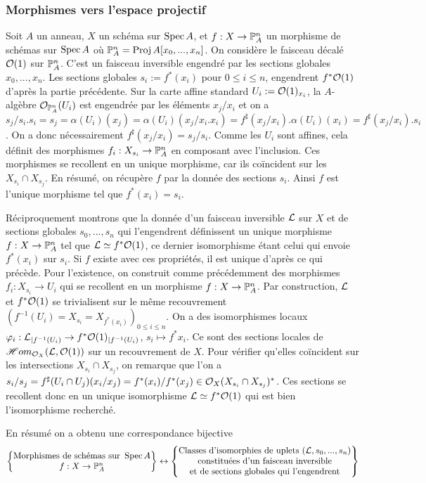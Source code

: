 \subsubsection{Morphismes vers l'espace projectif}
\label{morphismeproj}

Soit $A$ un anneau, $X$ un schéma sur $\operatorname{Spec} A$, et $f:X\rightarrow\mathbb{P}_A^n$ un morphisme de schémas sur $\operatorname{Spec} A$ où $\mathbb{P}^n_A=\operatorname{Proj} A[x_0,...,x_n]$. On considère le faisceau décalé $\mathcal{O}(1)$ sur $\mathbb{P}^n_A$. C'est un faisceau inversible engendré par les sections globales $x_0,...,x_n$. Les sections globales $s_i:=f^*(x_i)$ pour $0\leq i\leq n$, engendrent $f^*\mathcal{O}(1)$ d'après la partie précédente. Sur la carte affine standard $U_i:=\mathcal{O}(1)_{x_i}$, la $A$-algèbre $\mathcal{O}_{\mathbb{P}^n_A}(U_i)$ est engendrée par les éléments $x_j/x_i$ et on a $s_j/s_i.s_i=s_j=\alpha(U_i)(x_j)=\alpha(U_i)(x_j/x_i.x_i)=f^\sharp(x_j/x_i).\alpha(U_i)(x_i)=f^\sharp(x_j/x_i).s_i$. On a donc nécessairement $f^\sharp(x_j/x_i)=s_j/s_i$. Comme les $U_i$ sont affines, cela définit des morphismes $f_i:X_{s_i}\rightarrow \mathbb{P}^n_A$ en composant avec l'inclusion. Ces morphismes se recollent en un unique morphisme, car ils coïncident sur les $X_{s_i}\cap X_{s_j}$. En résumé, on récupère $f$ par la donnée des sections $s_i$. Ainsi $f$ est l'unique morphisme tel que $f^*(x_i)=s_i$.

Réciproquement montrons que la donnée d'un faisceau inversible $\mathcal{L}$ sur $X$ et de sections globales $s_0,...,s_n$ qui l'engendrent définissent un unique morphisme $f:X\rightarrow \mathbb{P}^n_A$ tel que $\mathcal{L}\simeq f^*\mathcal{O}(1)$, ce dernier isomorphisme étant celui qui envoie $f^*(x_i)$ sur $s_i$. Si $f$ existe avec ces propriétés, il est unique d'après ce qui précède. Pour l'existence, on construit comme précédemment des morphismes $f_i:X_{s_i}\rightarrow U_i$ qui se recollent en un morphisme $f:X\rightarrow \mathbb{P}^n_A$. Par construction, $\mathcal{L}$ et $f^*\mathcal{O}(1)$ se trivialisent sur le même recouvrement $(f^{-1}(U_i)=X_{s_i}=X_{f^*(x_i)})_{0\leq i\leq n}$. On a des isomorphismes locaux $\varphi_i:\mathcal{L}_{|f^{-1}(U_i)}\rightarrow f^*\mathcal{O}(1)_{|f^{-1}(U_i)}$, $s_i\mapsto f^*x_i$. Ce sont des sections locales de $\mathscr{H}om_{\mathcal{O}_X}(\mathcal{L},\mathcal{O}(1))$ sur un recouvrement de $X$. Pour vérifier qu'elles coïncident sur les intersections $X_{s_i}\cap X_{s_j}$, on remarque que l'on a $s_i/s_j=f^\sharp(U_i\cap U_j)(x_i/x_j)= f^*(x_i)/f^*(x_j)\in \mathcal{O}_X(X_{s_i}\cap X_{s_j})^*$. Ces sections se recollent donc en un unique isomorphisme $\mathcal{L}\simeq f^*\mathcal{O}(1)$ qui est bien l'isomorphisme recherché.

\noindent En résumé on a obtenu une correspondance bijective
$$
\left\{
\begin{matrix}
\text{Morphismes de schémas sur } \operatorname{Spec} A\\
f:X\rightarrow \mathbb{P}_A^n
\end{matrix}
\right\}
\leftrightarrow
\left\{
\begin{matrix}
\text{Classes d'isomorphies de uplets }(\mathcal{L}, s_0,...,s_n)\\
\text{constituées d'un faisceau inversible}\\
\text{et de sections globales qui l'engendrent}
\end{matrix}
\right\}
$$


